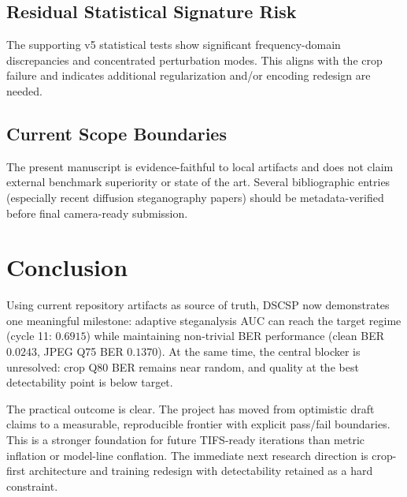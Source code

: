 \documentclass[journal]{IEEEtran}
\begin{document}
\subsection{Residual Statistical Signature Risk}
The supporting v5 statistical tests show significant frequency-domain discrepancies and concentrated perturbation modes. This aligns with the crop failure and indicates additional regularization and/or encoding redesign are needed.

\subsection{Current Scope Boundaries}
The present manuscript is evidence-faithful to local artifacts and does not claim external benchmark superiority or state of the art. Several bibliographic entries (especially recent diffusion steganography papers) should be metadata-verified before final camera-ready submission.

\section{Conclusion}
Using current repository artifacts as source of truth, DSCSP now demonstrates one meaningful milestone: adaptive steganalysis AUC can reach the target regime (cycle 11: $0.6915$) while maintaining non-trivial BER performance (clean BER $0.0243$, JPEG Q75 BER $0.1370$). At the same time, the central blocker is unresolved: crop Q80 BER remains near random, and quality at the best detectability point is below target.

The practical outcome is clear. The project has moved from optimistic draft claims to a measurable, reproducible frontier with explicit pass/fail boundaries. This is a stronger foundation for future TIFS-ready iterations than metric inflation or model-line conflation. The immediate next research direction is crop-first architecture and training redesign with detectability retained as a hard constraint.
\end{document}
